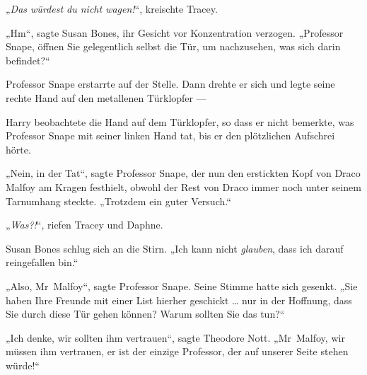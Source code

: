 „\emph{Das würdest du nicht wagen!}“, kreischte Tracey.

„Hm“, sagte Susan Bones, ihr Gesicht vor Konzentration verzogen.
„Professor Snape, öffnen Sie gelegentlich selbst die Tür, um nachzusehen, was sich darin befindet?“

Professor Snape erstarrte auf der Stelle. Dann drehte er sich und legte seine rechte Hand auf den metallenen Türklopfer —

Harry beobachtete die Hand auf dem Türklopfer, so dass er nicht bemerkte, was Professor Snape mit seiner linken Hand tat, bis er den plötzlichen Aufschrei hörte.

„Nein, in der Tat“, sagte Professor Snape, der nun den erstickten Kopf von Draco Malfoy am Kragen festhielt, obwohl der Rest von Draco immer noch unter seinem Tarnumhang steckte.
„Trotzdem ein guter Versuch.“

„\emph{Was?!}“, riefen Tracey und Daphne.

Susan Bones schlug sich an die Stirn.
„Ich kann nicht \emph{glauben}, dass ich darauf reingefallen bin.“

„Also, Mr~Malfoy“, sagte Professor Snape. Seine Stimme hatte sich gesenkt.
„Sie haben Ihre Freunde mit einer List hierher geschickt … nur in der Hoffnung, dass Sie durch diese Tür gehen können? Warum sollten Sie das tun?“

„Ich denke, wir sollten ihm vertrauen“, sagte Theodore Nott.
„Mr~Malfoy, wir müssen ihm vertrauen, er ist der einzige Professor, der auf unserer Seite stehen würde!“

